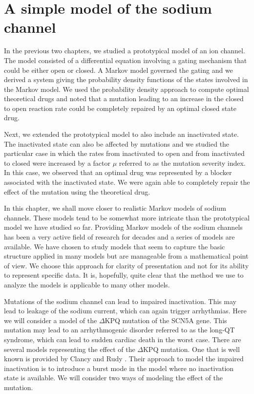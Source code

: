 

\chapter{A simple model of the sodium channel}
\label{simple_Na}

In the previous two chapters, we studied a prototypical model of an ion
channel. The model consisted of a differential equation involving a gating
mechanism that could be either open or closed. A Markov model governed the
gating and we derived a system giving the probability density functions of
the states involved in the Markov model. We used the probability density
approach to compute optimal theoretical drugs and noted that a mutation
leading to an increase in the closed to open reaction rate could be completely
repaired by an optimal closed state drug.

Next, we extended the prototypical model to also include an inactivated state.
The inactivated state can also be affected by mutations and we studied the
particular case in which the rates from inactivated to open and from 
inactivated to closed were increased by a factor $\mu$ referred to as the 
mutation severity index. In this case, we observed that an optimal drug was 
represented by a blocker associated with the inactivated state. We were again
able to completely repair the effect of the mutation using the theoretical
 drug.

In this chapter, we shall move closer to realistic Markov models of sodium
channels. These models tend to be somewhat more intricate than the
prototypical model we have studied so far. Providing Markov models of the
sodium channels has been a very active field of research for decades and a
series of models are available. We have chosen to study models that seem to
capture the basic structure applied in many models but are manageable from a
mathematical point of view. We choose this approach for clarity of
presentation and not for its ability to represent specific data. It is,
hopefully, quite clear that the method we use to analyze the models is
applicable to many other models.

Mutations of the sodium channel can lead to impaired inactivation. This may
lead to leakage of the sodium current, which can again trigger arrhythmias.
Here we will consider a model of the $\Delta$KPQ mutation of the SCN5A gene.
This mutation may lead to an arrhythmogenic disorder referred to as the long-QT
syndrome, which can lead to sudden cardiac death in the worst case. There are
several models representing the effect of the $\Delta$KPQ mutation. 
One that is well known is
provided by Clancy and Rudy \cite{Clancy1999}. Their approach to model the
impaired inactivation is to introduce a burst mode in the model where no
inactivation state is available. We will consider two ways of modeling the
effect of the mutation.

